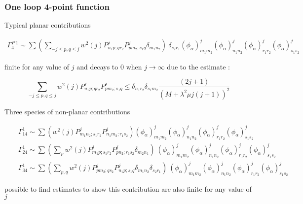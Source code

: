 \documentclass[9pt]{beamer}
\begin{document}
\begin{frame}

\frametitle{One loop 4-point function}

Typical planar contributions 

\begin{eqnarray*}
\Gamma^{P\ 1}_4 \sim \sum\left(\sum_{-j\le p,q\le j}w^2(j)P^j_{n_1p;qr_2}P^j_{pm_2;s_1q}\delta_{m_1n_2}\right) \ \delta_{s_2r_1} (\phi_\alpha)^j_{m_1m_2}(\phi_\alpha)^j_{n_1n_2}(\phi_\alpha)^j_{r_1r_2}(\phi_\alpha)^j_{s_1s_2}
\end{eqnarray*}

finite for any value of $j$ and decays to $0$ when $j\to\infty$ due to the estimate :

\begin{equation*}
\sum_{-j\le p,q\le j}w^2(j)P^j_{n_1p;qr_2}P^j_{pm_2;s_1q}\le\delta_{n_1r_2}
\delta_{s_1m_2} \frac{(2j+1)}{(M+\lambda^2\mu j(j+1))^2}
\end{equation*}

Three species of non-planar contributions 

\begin{eqnarray*}
&& \Gamma^1_{14}\sim\sum \left(w^2(j) P^j_{m_1n_2;s_1r_2} P^j_{n_1m_2;r_1s_2}\right)(\phi_\alpha)^j_{m_1m_2}(\phi_\alpha)^j_{n_1n_2}(\phi_\alpha)^j_{r_1r_2}(\phi_\alpha)^j_{s_1s_2}\\
%
&& \Gamma^1_{24} \sim \sum \left( \sum_p w^2(j) P^j_{m_1p;s_1r_2} P^j_{pn_2;r_1s_2} \delta_{m_2n_1} \right) \ (\phi_\alpha)^j_{m_1m_2}(\phi_\alpha)^j_{n_1n_2}(\phi_\alpha)^j_{r_1r_2}(\phi_\alpha)^j_{s_1s_2}\\
&& \Gamma^1_{34}\sim\sum\left(\sum_{p,q}w^2(j)P^j_{pm_2;qs_2}P^j_{n_1p;s_1q}
\delta_{m_1n_2}\delta_{s_2r_1} \right) \ (\phi_\alpha)^j_{m_1m_2}(\phi_\alpha)^j_{n_1n_2}(\phi_\alpha)^j_{r_1r_2}(\phi_\alpha)^j_{s_1s_2}
\end{eqnarray*}

possible to find estimates to show this contribution are also finite for any value of $j$

\end{frame}

\end{document}
